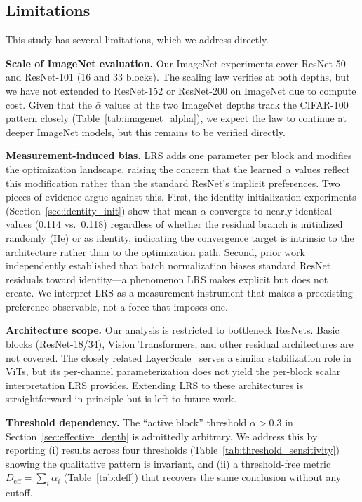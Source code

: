 \documentclass[preprint,12pt]{elsarticle}
\begin{document}
\subsection{Limitations}

This study has several limitations, which we address directly.

\textbf{Scale of ImageNet evaluation.} Our ImageNet experiments cover ResNet-50 and ResNet-101 (16 and 33 blocks). The scaling law verifies at both depths, but we have not extended to ResNet-152 or ResNet-200 on ImageNet due to compute cost. Given that the $\bar{\alpha}$ values at the two ImageNet depths track the CIFAR-100 pattern closely (Table~\ref{tab:imagenet_alpha}), we expect the law to continue at deeper ImageNet models, but this remains to be verified directly.

\textbf{Measurement-induced bias.} LRS adds one parameter per block and modifies the optimization landscape, raising the concern that the learned $\alpha$ values reflect this modification rather than the standard ResNet's implicit preferences. Two pieces of evidence argue against this. First, the identity-initialization experiments (Section~\ref{sec:identity_init}) show that mean $\alpha$ converges to nearly identical values (0.114 vs.\ 0.118) regardless of whether the residual branch is initialized randomly (He) or as identity, indicating the convergence target is intrinsic to the architecture rather than to the optimization path. Second, prior work~\cite{de2020batch} independently established that batch normalization biases standard ResNet residuals toward identity---a phenomenon LRS makes explicit but does not create. We interpret LRS as a measurement instrument that makes a preexisting preference observable, not a force that imposes one.

\textbf{Architecture scope.} Our analysis is restricted to bottleneck ResNets. Basic blocks (ResNet-18/34), Vision Transformers, and other residual architectures are not covered. The closely related LayerScale~\cite{touvron2021going} serves a similar stabilization role in ViTs, but its per-channel parameterization does not yield the per-block scalar interpretation LRS provides. Extending LRS to these architectures is straightforward in principle but is left to future work.

\textbf{Threshold dependency.} The ``active block'' threshold $\alpha > 0.3$ in Section~\ref{sec:effective_depth} is admittedly arbitrary. We address this by reporting (i) results across four thresholds (Table~\ref{tab:threshold_sensitivity}) showing the qualitative pattern is invariant, and (ii) a threshold-free metric $D_\text{eff} = \sum_i \alpha_i$ (Table~\ref{tab:deff}) that recovers the same conclusion without any cutoff.
\end{document}
